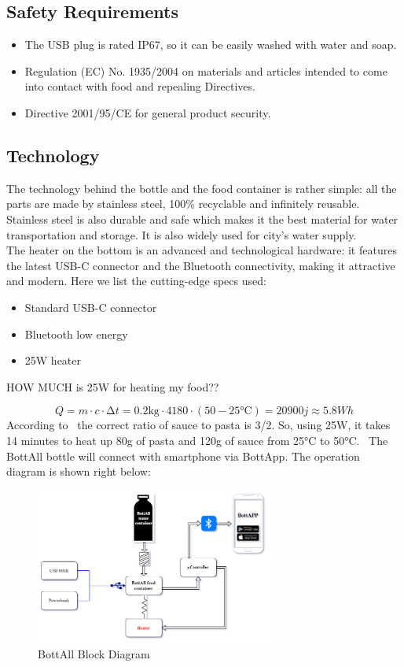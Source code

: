 \subsection{Safety Requirements}
\begin{itemize}
\item The USB plug is rated IP67, so it can be easily washed with water and soap. 
\item Regulation (EC) No. 1935/2004 on materials and articles intended to come into contact with food and repealing Directives. %
\item Directive 2001/95/CE for general product security.
\end{itemize}

\subsection{Technology}
The technology behind the bottle and the food container is rather simple: all the parts are made by stainless steel, 100\% recyclable and infinitely reusable. Stainless steel is also durable and safe which makes it the best material for water transportation and storage. It is also widely used for city's water supply.\\
The heater on the bottom is an advanced and technological hardware: it features the latest USB-C connector and the Bluetooth connectivity, making it attractive and modern. Here we list the cutting-edge specs used: 
\begin{itemize}
\item Standard USB-C connector
\item Bluetooth low energy
\item 25W heater
\end{itemize}

\fullboxbegin
\begin{center}
HOW MUCH is 25W for heating my food??
\end{center}
$$Q=m\cdot c\cdot ∆t=0.2\si{\kilo\gram}\cdot 4180\cdot (50-25\si{\celsius})=20900\si{j}≈5.8 \si{Wh}$$
According to~\cite{sugo_e_pasta} the correct ratio of sauce to pasta is 3/2.
So, using 25W, it takes 14 minutes to heat up 80g of pasta and 120g of sauce from 25°C to 50°C.~\cite{energia_pasta}
\fullboxend
The BottAll bottle will connect with smartphone via BottApp. The operation diagram is shown right below:

\begin{figure}[H]
\centering
\includegraphics[width=0.7\textwidth]{images/bottigl1-block-diagram2.png}
\caption{BottAll Block Diagram}
\end{figure}

